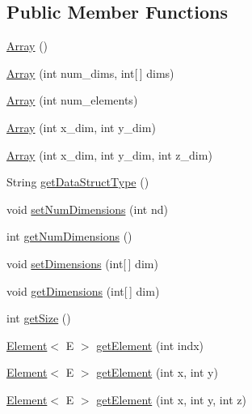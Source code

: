 \subsection*{Public Member Functions}
\begin{DoxyCompactItemize}
\item 
\hyperlink{classbridges_1_1base_1_1_array_ad5dbf7bbd9811c2dac16a5c135465d4b}{Array} ()
\item 
\hyperlink{classbridges_1_1base_1_1_array_ab37dbe6efe0c34242456971e430763f7}{Array} (int num\+\_\+dims, int\mbox{[}$\,$\mbox{]} dims)
\item 
\hyperlink{classbridges_1_1base_1_1_array_acd4d14ab49b5d17ec2fb7a9234d31b4f}{Array} (int num\+\_\+elements)
\item 
\hyperlink{classbridges_1_1base_1_1_array_a2bdb4561fdbe033328db9febf636c23b}{Array} (int x\+\_\+dim, int y\+\_\+dim)
\item 
\hyperlink{classbridges_1_1base_1_1_array_a04dd28aef8d7597ad91bd2650d390506}{Array} (int x\+\_\+dim, int y\+\_\+dim, int z\+\_\+dim)
\item 
String \hyperlink{classbridges_1_1base_1_1_array_ad138b9787d46d053d6bd324b344be9a6}{get\+Data\+Struct\+Type} ()
\item 
void \hyperlink{classbridges_1_1base_1_1_array_ab7859668a25d16adfdb308e24c7d44c6}{set\+Num\+Dimensions} (int nd)
\item 
int \hyperlink{classbridges_1_1base_1_1_array_a808da9a62df3f0e7a905ec895a82087a}{get\+Num\+Dimensions} ()
\item 
void \hyperlink{classbridges_1_1base_1_1_array_a7ec1260b85f7353ec00c873cf719eea1}{set\+Dimensions} (int\mbox{[}$\,$\mbox{]} dim)
\item 
void \hyperlink{classbridges_1_1base_1_1_array_af7aa7f3f18989af5f48a2b69cb7fb07d}{get\+Dimensions} (int\mbox{[}$\,$\mbox{]} dim)
\item 
int \hyperlink{classbridges_1_1base_1_1_array_a49a3a4ea72c8315f1f14eed25071d18a}{get\+Size} ()
\item 
\hyperlink{classbridges_1_1base_1_1_element}{Element}$<$ E $>$ \hyperlink{classbridges_1_1base_1_1_array_a0e690cbe2606e44cce99b56802b63e0e}{get\+Element} (int indx)
\item 
\hyperlink{classbridges_1_1base_1_1_element}{Element}$<$ E $>$ \hyperlink{classbridges_1_1base_1_1_array_a9eff153c6b63572c18af6194c66ca34c}{get\+Element} (int x, int y)
\item 
\hyperlink{classbridges_1_1base_1_1_element}{Element}$<$ E $>$ \hyperlink{classbridges_1_1base_1_1_array_a09b5bd2d3b4cd12aea34b5e62b5e801a}{get\+Element} (int x, int y, int z)

\end{DoxyCompactItemize}
